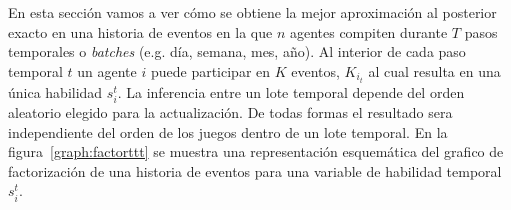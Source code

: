 \documentclass[11pt,twoside,spanish]{report} %
\begin{document}
En esta secci\'on vamos a ver c\'omo se obtiene la mejor aproximaci\'on al posterior exacto en una historia de eventos en la que $n$ agentes compiten durante $T$ pasos temporales o \emph{batches} (e.g. d\'ia, semana, mes, año).
Al interior de cada paso temporal $t$ un agente $i$ puede participar en $K$ eventos, $K_{i_t}$ al cual resulta en una \'unica habilidad $s_i^t$.
La inferencia entre un lote temporal depende del orden aleatorio elegido para la actualizaci\'on. 
De todas formas el resultado sera independiente del orden de los juegos dentro de un lote temporal.
En la figura~\ref{graph:factorttt} se muestra una representaci\'on esquemática del grafico de factorizaci\'on de una historia de eventos para una variable de habilidad temporal $s_i^t$.




\begin{figure}[H]
\centering
\end{figure}
\end{document}
